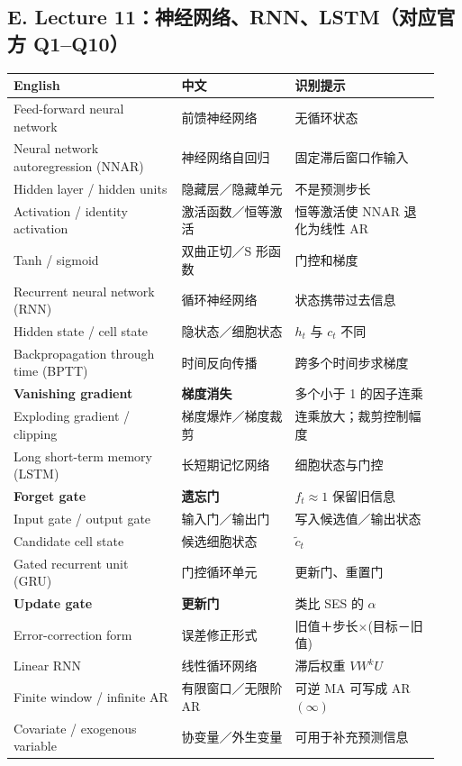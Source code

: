\documentclass[UTF8,fontset=fandol,10.5pt,a4paper]{ctexart}
\begin{document}
\subsection*{E. Lecture 11：神经网络、RNN、LSTM（对应官方 Q1--Q10）}
\begin{longtable}{@{}p{0.37\linewidth}p{0.25\linewidth}p{0.32\linewidth}@{}}
\toprule English & 中文 & 识别提示\\\midrule\endhead
Feed-forward neural network & 前馈神经网络 & 无循环状态\\
Neural network autoregression (NNAR) & 神经网络自回归 & 固定滞后窗口作输入\\
Hidden layer / hidden units & 隐藏层／隐藏单元 & 不是预测步长\\
Activation / identity activation & 激活函数／恒等激活 & 恒等激活使 NNAR 退化为线性 AR\\
Tanh / sigmoid & 双曲正切／S 形函数 & 门控和梯度\\
Recurrent neural network (RNN) & 循环神经网络 & 状态携带过去信息\\
Hidden state / cell state & 隐状态／细胞状态 & $h_t$ 与 $c_t$ 不同\\
Backpropagation through time (BPTT) & 时间反向传播 & 跨多个时间步求梯度\\
\textbf{Vanishing gradient} & \textbf{梯度消失} & 多个小于 1 的因子连乘\\
Exploding gradient / clipping & 梯度爆炸／梯度裁剪 & 连乘放大；裁剪控制幅度\\
Long short-term memory (LSTM) & 长短期记忆网络 & 细胞状态与门控\\
\textbf{Forget gate} & \textbf{遗忘门} & $f_t\approx1$ 保留旧信息\\
Input gate / output gate & 输入门／输出门 & 写入候选值／输出状态\\
Candidate cell state & 候选细胞状态 & $\tilde c_t$\\
Gated recurrent unit (GRU) & 门控循环单元 & 更新门、重置门\\
\textbf{Update gate} & \textbf{更新门} & 类比 SES 的 $\alpha$\\
Error-correction form & 误差修正形式 & 旧值＋步长$\times$(目标－旧值)\\
Linear RNN & 线性循环网络 & 滞后权重 $VW^kU$\\
Finite window / infinite AR & 有限窗口／无限阶 AR & 可逆 MA 可写成 AR$(\infty)$\\
Covariate / exogenous variable & 协变量／外生变量 & 可用于补充预测信息\\
\bottomrule
\end{longtable}
\end{document}
